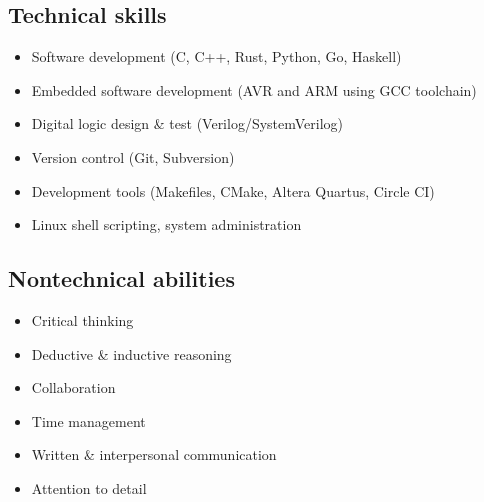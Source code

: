 
\vspace{-1.2em}

\begin{multicols}{2}
  \subsection*{Technical skills}

  \begin{itemize}
    \item Software development (C, C++, Rust, Python, Go, Haskell)
    \item Embedded software development (AVR and ARM using GCC toolchain)
    \item Digital logic design \& test (Verilog/SystemVerilog)
    \item Version control (Git, Subversion)
    \item Development tools (Makefiles, CMake, Altera Quartus, Circle CI)
    \item Linux shell scripting, system administration
  \end{itemize}

  \vfill\null
  \columnbreak

  \subsection*{Nontechnical abilities}

  \begin{itemize}
    \item Critical thinking
    \item Deductive \& inductive reasoning
    \item Collaboration
    \item Time management
    \item Written \& interpersonal communication
    \item Attention to detail
  \end{itemize}

  \vfill\null
\end{multicols}
